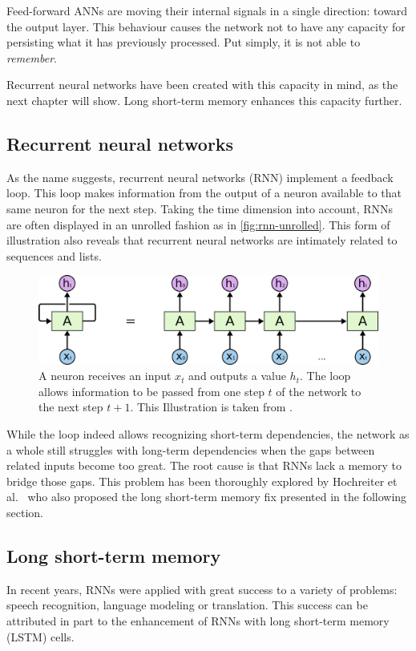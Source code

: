 Feed-forward ANNs are moving their internal signals in a single direction: toward the output layer. This behaviour causes the network not to have any capacity for persisting what it has previously processed. Put simply, it is not able to \textit{remember}.

Recurrent neural networks have been created with this capacity in mind, as the next chapter will show. Long short-term memory enhances this capacity further.

\subsection{Recurrent neural networks}\label{sec:recurrent-networks}
As the name suggests, recurrent neural networks (RNN) implement a feedback loop. This loop makes information from the output of a neuron available to that same neuron for the next step. Taking the time dimension into account, RNNs are often displayed in an unrolled fashion as in \autoref{fig:rnn-unrolled}. This form of illustration also reveals that recurrent neural networks are intimately related to sequences and lists.

\begin{figure}
    \centering
    \includegraphics[width=.9\textwidth]{gfx/rnn-unrolled.png}
    \caption{A neuron receives an input $x_t$ and outputs a value $h_t$. The loop allows information to be passed from one step $t$ of the network to the next step $t+1$. This Illustration is taken from \cite{web:colah}.}
    \label{fig:rnn-unrolled}
\end{figure}

While the loop indeed allows recognizing short-term dependencies, the network as a whole still struggles with long-term dependencies when the gaps between related inputs become too great. The root cause is that RNNs lack a memory to bridge those gaps. This problem has been thoroughly explored by Hochreiter et al.~\cite{hochreiter1991untersuchungen} who also proposed the long short-term memory fix presented in the following section.

\subsection{Long short-term memory}\label{sec:lstm}
In recent years, RNNs were applied with great success to a variety of problems: speech recognition, language modeling or translation. This success can be attributed in part to the enhancement of RNNs with long short-term memory (LSTM) cells.

